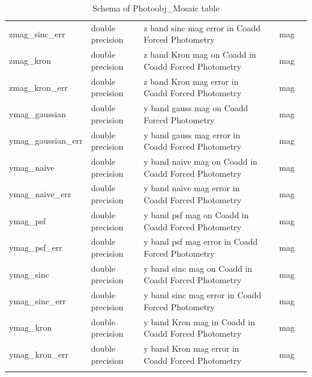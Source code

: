 \documentclass[12pt]{article}
\begin{document}
\begin{table}[thbp]
\begin{center}
{\begin{tabular}{llllll}
zmag\_sinc\_err & double precision & z band sinc mag error in Coadd Forced Photometry        &                            & mag            &   \\
zmag\_kron & double precision & z band Kron mag on Coadd in Coadd Forced Photometry         &                            & mag            &   \\
zmag\_kron\_err & double precision & z band Kron mag error in Coadd Forced Photometry        &                            & mag            &   \\
ymag\_gaussian & double precision & y band gauss mag on Coadd Forced Photometry               &                            & mag            &   \\
ymag\_gaussian\_err & double precision & y band gauss mag error in Coadd Forced Photometry     &                            & mag            &   \\
ymag\_naive & double precision & y band naive mag on Coadd in Coadd Forced Photometry         &                            & mag            &   \\
ymag\_naive\_err & double precision & y band naive mag error in Coadd Forced Photometry        &                            & mag            &   \\
ymag\_psf & double precision & y band psf mag on Coadd in Coadd Forced Photometry         &                            & mag            &  \\
ymag\_psf\_err & double precision & y band psf mag error in Coadd Forced Photometry        &                            & mag            &   \\
ymag\_sinc & double precision & y band sinc mag on Coadd in Coadd Forced Photometry         &                            & mag            &  \\
ymag\_sinc\_err & double precision & y band sinc mag error in Coadd Forced Photometry        &                            & mag            &   \\
ymag\_kron & double precision & y band Kron mag in Coadd in Coadd Forced Photometry         &                            & mag            &   \\
ymag\_kron\_err & double precision & y band Kron mag error in Coadd Forced Photometry        &                            & mag            &   \\
\hline\\
\end{tabular}
}
\caption{Schema of Photoobj\_Mosaic table}
\end{center}
\end{table}
\end{document}
